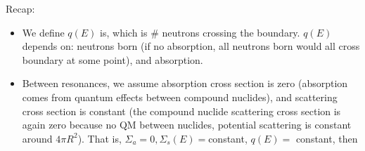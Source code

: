 \documentclass{school-22.211-notes}
\begin{document}
\begin{enumerate}
      Recap: 
      \begin{itemize}
      \item We define $q(E)$ is, which is \# neutrons crossing the boundary. $q(E)$ depends on: neutrons born (if no absorption, all neutrons born would all cross boundary at some point), and absorption. 
      \item Between resonances, we assume absorption cross section is zero (absorption comes from quantum effects between compound nuclides), and scattering cross section is constant (the compound nuclide scattering cross section is again zero because no QM between nuclides, potential scattering is constant around $4 \pi R^2$). That is, $\Sigma_a = 0, \Sigma_s (E) = $constant, $q(E) = $ constant, then
      \end{itemize}





\end{enumerate}
\end{document}
